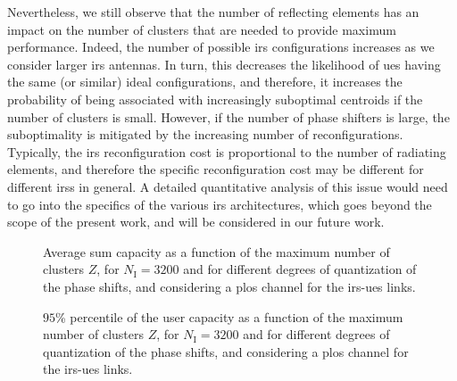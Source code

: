 Nevertheless, we still observe that the number of reflecting elements has an impact on the number of clusters that are needed to provide maximum performance.
Indeed, the number of possible \gls{irs} configurations increases as we consider larger \gls{irs} antennas. In turn, this decreases the likelihood of \glspl{ue} having the same (or similar) ideal configurations, and therefore, it increases the probability of being associated with increasingly suboptimal centroids if the number of clusters is small. However, if the number of phase shifters is large, the suboptimality is mitigated by the increasing number of reconfigurations. Typically, the \gls{irs} reconfiguration cost is proportional to the number of
radiating elements, and therefore the specific reconfiguration cost may be different for different \glspl{irs} in general. A detailed quantitative analysis of this issue would need to go into the specifics of the various \gls{irs} architectures, which goes beyond the scope of the present work, and will be considered in our future work.

\begin{figure}[t!]
    \centering
    \setlength{}
    \setlength{}
    
    \caption{Average sum capacity as a function of the maximum number of clusters $Z$, for $N_{\mathrm I}=3200$ and for different degrees of quantization of the phase shifts, and considering a \gls{plos} channel for the \gls{irs}-\glspl{ue} links.}
    \label{fig:cap_vs_bits}
\end{figure}
\begin{figure}[t!]
    \centering
    \setlength{}
    \setlength{}
    
    \caption{$95$\% percentile of the user capacity as a function of the maximum number of clusters $Z$, for $N_{\mathrm I}=3200$ and for different degrees of quantization of the phase shifts, and considering a \gls{plos} channel for the \gls{irs}-\glspl{ue} links.}
    \label{fig:quantile_vs_bits}
\end{figure}


